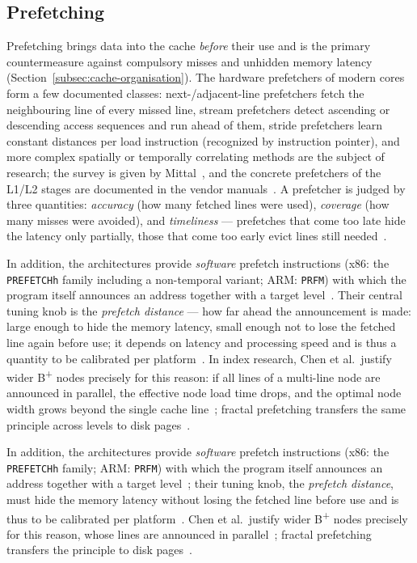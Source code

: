 \subsection{Prefetching}\label{subsec:prefetching}
Prefetching brings data into the cache \emph{before} their use and is the primary countermeasure
against compulsory misses and unhidden memory latency
(Section~\ref{subsec:cache-organisation}). The hardware prefetchers of modern cores form a few
documented classes: next-/adjacent-line prefetchers fetch the neighbouring line of every missed
line, stream prefetchers detect ascending or descending access sequences and run ahead of them,
stride prefetchers learn constant distances per load instruction (recognized by instruction
pointer), and more complex spatially or temporally correlating methods are the subject of research;
the survey is given by Mittal~\cite{mittal2016prefetching}, and the concrete prefetchers of the
L1/L2 stages are documented in the vendor manuals~\cite{intel_optimization,amd_sog}. A prefetcher
is judged by three quantities: \emph{accuracy} (how many fetched lines were used), \emph{coverage}
(how many misses were avoided), and \emph{timeliness} --- prefetches that come too late hide the
latency only partially, those that come too early evict lines still
needed~\cite{mittal2016prefetching}.

\begin{nurlang}
In addition, the architectures provide \emph{software} prefetch instructions (x86: the
\texttt{PREFETCHh} family including a non-temporal variant; ARM\@: \texttt{PRFM}) with which the
program itself announces an address together with a target level~\cite{intel_sdm,arm_arm}. Their
central tuning knob is the \emph{prefetch distance} --- how far ahead the announcement is made:
large enough to hide the memory latency, small enough not to lose the fetched line again before
use; it depends on latency and processing speed and is thus a quantity to be calibrated per
platform~\cite{mittal2016prefetching}. In index research, Chen et al.\ justify wider
B\textsuperscript{+} nodes precisely for this reason: if all lines of a multi-line node are announced
in parallel, the effective node load time drops, and the optimal node width grows beyond the single
cache line~\cite{chen2001prefetch}; fractal prefetching transfers the same principle across levels
to disk pages~\cite{chen2002fractal}.
\end{nurlang}
\begin{nurkurz}
In addition, the architectures provide \emph{software} prefetch instructions (x86: the \texttt{PREFETCHh}
family; ARM\@: \texttt{PRFM}) with which the program itself announces an address together with a target
level~\cite{intel_sdm,arm_arm}; their tuning knob, the \emph{prefetch distance}, must hide the memory latency
without losing the fetched line before use and is thus to be calibrated per
platform~\cite{mittal2016prefetching}. Chen et al.\ justify wider B\textsuperscript{+} nodes precisely for this
reason, whose lines are announced in parallel~\cite{chen2001prefetch}; fractal prefetching transfers the
principle to disk pages~\cite{chen2002fractal}.
\end{nurkurz}

